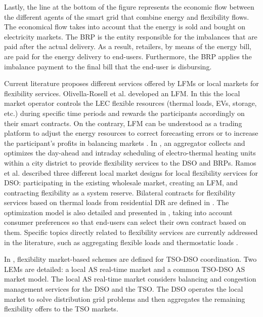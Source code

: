 Lastly, the line at the bottom of the figure represents the economic flow between the different agents of the smart grid that combine energy and flexibility flows. The economical flow takes into account that the energy is sold and bought on electricity markets. The BRP is the entity responsible for the imbalances that are paid after the actual delivery. As a result, retailers, by means of the energy bill, are paid for the energy delivery to end-users. Furthermore, the BRP applies the imbalance payment to the final bill that the end-user is disbursing.

Current literature proposes different services offered by LFMs or local markets for flexibility services. Olivella-Rosell et al. \cite{Olivella2018} developed an LFM. In this the local market operator controls the LEC flexible resources (thermal loads, EVs, storage, etc.) during specific time periods and rewards the participants accordingly on their smart contracts. On the contrary, LFM can be understood as a trading platform to adjust the energy resources to correct forecasting errors or to increase the participant's profits in balancing markets \cite{ilieva2016design}. In \cite{diekerhof2017hierarchical}, an aggregator collects and optimizes the day-ahead and intraday scheduling of electro-thermal heating units within a city district to provide flexibility services to the DSO and BRPs. Ramos et al. \cite{ramos2016realizing} described three different local market designs for local flexibility services for DSO: participating in the existing wholesale market, creating an LFM, and contracting flexibility as a system reserve. Bilateral contracts for flexibility services based on thermal loads from residential DR are defined in \cite{boscan2016flexibility}. The optimization model is also detailed and presented in \cite{boscan2016flexibility}, taking into account consumer preferences so that end-users can select their own contract based on them. Specific topics directly related to flexibility services are currently addressed in the literature, such as aggregating flexible loads \cite{nayyar2013aggregate, pandvzic2013offering} and thermostatic loads \cite{alahaivala2017control}.

In \cite{leclercq2019network}, flexibility market-based schemes are defined for TSO-DSO coordination. Two LEMs are detailed: a local AS real-time market and a common TSO-DSO AS market model. The local AS real-time market considers balancing and congestion management services for the DSO and the TSO. The DSO operates the local market to solve distribution grid problems and then aggregates the remaining flexibility offers to the TSO markets. 

